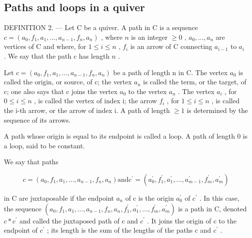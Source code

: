 \subsection{Paths and loops in a quiver}

DEFINITION 2. --- Let C be a quiver. A path in C is a sequence \(c = (a_{0}, f_{1}, a_{1}, \ldots, a_{n-1}, f_{n}, a_{n})\) , where \(n\) is an integer \(\geqslant 0\) , \(a_{0}, \ldots, a_{n}\) are vertices of C and where, for \(1 \leqslant i \leqslant n\) , \(f_{i}\) is an arrow of C connecting \(a_{i-1}\) to \(a_{i}\) . We say that the path c has length \(n\) .

Let \(c = (a_{0}, f_{1}, a_{1}, \ldots, a_{n-1}, f_{n}, a_{n})\) be a path of length n in C. The vertex \(a_{0}\) is called the origin, or source, of c; the vertex \(a_{n}\) is called the term, or the target, of c; one also says that c joins the vertex \(a_{0}\) to the vertex \(a_{n}\) . The vertex \(a_{i}\) , for \(0 \leqslant i \leqslant n\) , is called the vertex of index i; the arrow \(f_{i}\) , for \(1 \leqslant i \leqslant n\) , is called the i-th arrow, or the arrow of index i. A path of length \(\geqslant 1\) is determined by the sequence of its arrows.

A path whose origin is equal to its endpoint is called a loop. A path of length 0 is a loop, said to be constant.

We say that paths

\[
c = (a _ {0}, f _ {1}, a _ {1}, \ldots , a _ {n - 1}, f _ {n}, a _ {n}) \text{and} c ^ {\prime} = (a _ {0} ^ {\prime}, f _ {1} ^ {\prime}, a _ {1} ^ {\prime}, \ldots , a _ {m - 1} ^ {\prime}, f _ {m} ^ {\prime}, a _ {m} ^ {\prime})
\]

in C are juxtaposable if the endpoint \(a_{n}\) of c is the origin \(a_{0}^{\prime}\) of \(c^{\prime}\) . In this case, the sequence \((a_{0}, f_{1}, a_{1}, \ldots, a_{n-1}, f_{n}, a_{n}, f_{1}^{\prime}, a_{1}^{\prime}, \ldots, f_{m}^{\prime}, a_{m}^{\prime})\) is a path in C, denoted \(c * c^{\prime}\) and called the juxtaposed path of c and \(c^{\prime}\) . It joins the origin of c to the endpoint of \(c^{\prime}\) ; its length is the sum of the lengths of the paths c and \(c^{\prime}\) .

